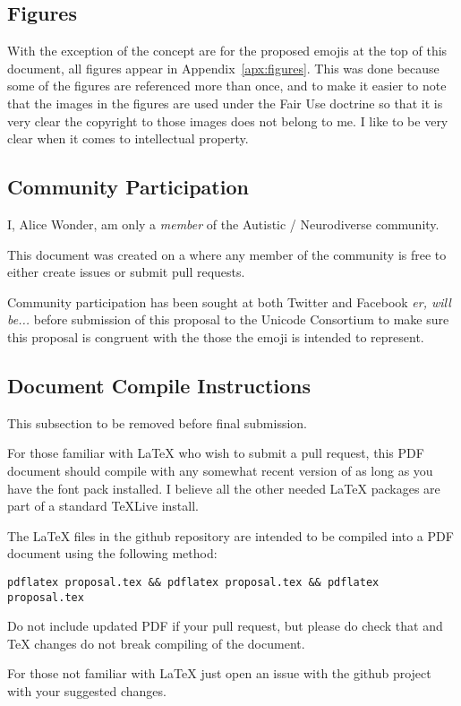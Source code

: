 \subsection*{Figures}

With the exception of the concept are for the proposed emojis at the top of
this document, all figures appear in Appendix~\ref{apx:figures}. This was done because
some of the figures are referenced more than once, and to make it easier to note that
the images in the figures are used under the Fair Use doctrine so that it is very
clear the copyright to those images does not belong to me. I like to be very clear
when it comes to intellectual property.

\subsection*{Community Participation}

I, Alice Wonder, am only a \emph{member} of the Autistic / Neurodiverse community.

This document was created on a
where any member of the community is free to either create issues or submit pull
requests.

Community participation has been sought at both Twitter and Facebook \emph{er, will be...}
before submission of this proposal to the Unicode Consortium to make sure this proposal is
congruent with the those the emoji is intended to represent.

\subsection*{Document Compile Instructions}
This subsection to be removed before final submission.

For those familiar with \LaTeX{} who wish to submit a pull request, this PDF document
should compile with any somewhat recent version of
 as long as you have the
 font pack installed. I believe
all the other needed \LaTeX{} packages are part of a standard \TeX{}Live install.

The \LaTeX{} files in the github repository are intended to be compiled into a PDF document
using the following method:

\begin{verbatim}
pdflatex proposal.tex && pdflatex proposal.tex && pdflatex proposal.tex
\end{verbatim}

Do not include updated PDF if your pull request, but please do check that and TeX changes
do not break compiling of the document.

For those not familiar with \LaTeX{} just open an issue with the github project with your
suggested changes.

